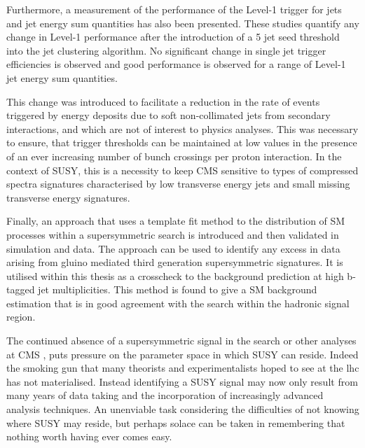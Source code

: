 Furthermore, a measurement of the performance of the Level-1 trigger for jets and jet energy sum quantities has also been presented. These studies quantify any change in Level-1 performance after the introduction of a 5 \GeV jet seed threshold into the jet clustering algorithm.  No significant change in single jet trigger efficiencies is observed and good performance is observed for a range of Level-1 jet energy sum quantities.

This change was introduced to facilitate a reduction in the rate of events triggered by energy deposits due to soft non-collimated jets from secondary interactions, and which are not of interest to physics analyses. This was necessary to ensure, that trigger thresholds can be maintained at low values in the presence of an ever increasing number of bunch crossings per proton interaction. In the context of \ac{SUSY}, this is a necessity to keep \ac{CMS} sensitive to types of compressed spectra signatures characterised by low transverse energy jets and small missing transverse energy signatures.

Finally, an approach that uses a template fit method to the \nbreco distribution of \ac{SM} processes within a supersymmetric search is introduced and then validated in simulation and data. The approach can be used to identify any excess in data arising from gluino mediated third generation supersymmetric signatures. It is utilised within this thesis as a crosscheck to the \alphat background prediction at high b-tagged jet multiplicities. This method is found to give a \ac{SM} background estimation that is in good agreement with the \alphat search within the hadronic signal region.

The continued absence of a supersymmetric signal in the \alphat search or other analyses at \ac{CMS} \cite{Chatrchyan:2014lfa}\cite{Chatrchyan:2013fea}\cite{Chatrchyan:2013iqa}, puts pressure on the parameter space in which \ac{SUSY} can reside. Indeed the smoking gun that many theorists and experimentalists hoped to see at the \ac{lhc} has not materialised. Instead identifying a \ac{SUSY} signal may now only result from many years of data taking and the incorporation of increasingly advanced analysis techniques. An unenviable task considering the difficulties of not knowing where \ac{SUSY} may reside, but perhaps solace can be taken in remembering that nothing worth having ever comes easy.

\phantom{}
